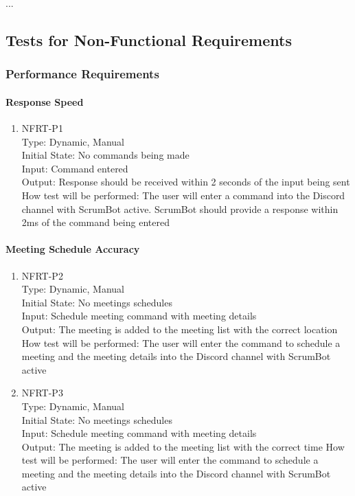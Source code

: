 \documentclass[12pt, titlepage]{article}
\begin{document}
...

\subsection{Tests for Non-Functional Requirements}

\subsubsection{Performance Requirements}
\paragraph{Response Speed}
\begin{enumerate}
\item{NFRT-P1}\\
Type: Dynamic, Manual\\
Initial State: No commands being made\\
Input: Command entered\\
Output: Response should be received within 2 seconds of the input being sent
How test will be performed: The user will enter a command into the Discord channel with ScrumBot active. ScrumBot should provide a response within 2ms of the command being entered
\end{enumerate}
\paragraph{Meeting Schedule Accuracy}
\begin{enumerate}
\item{NFRT-P2}\\
Type: Dynamic, Manual\\
Initial State: No meetings schedules\\
Input: Schedule meeting command with meeting details\\
Output: The meeting is added to the meeting list with the correct location
How test will be performed: The user will enter the command to schedule a meeting and the meeting details into the Discord channel with ScrumBot active
\item{NFRT-P3}\\
Type: Dynamic, Manual\\
Initial State: No meetings schedules\\
Input: Schedule meeting command with meeting details\\
Output: The meeting is added to the meeting list with the correct time
How test will be performed: The user will enter the command to schedule a meeting and the meeting details into the Discord channel with ScrumBot active
\end{enumerate}
\end{document}
